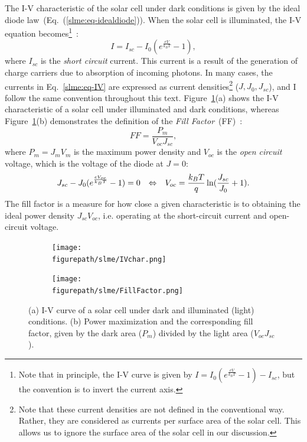 \begin{refsection}
The I-V characteristic of the solar cell under dark conditions is given by the 
ideal diode law~(Eq.~(\ref{slme:eq-idealdiode})). When the solar cell is 
illuminated, the I-V equation becomes\footnote{Note that in principle, the I-V 
curve is given by $I = I_0 (e^\frac{e V}{k_B T} - 1) - I_{sc}$, but the 
convention is to invert the current axis.}~\cite{Lindholm1979}: 
\begin{equation}\label{slme:eq-IV} 
I = I_{sc} - I_0 (e^\frac{e V}{k_B T} - 1), 
\end{equation} 
where $I_{sc}$ is the \textit{short circuit} current. This current is a result 
of the generation of charge carriers due to absorption of incoming photons. In 
many cases, the currents in Eq.~\ref{slme:eq-IV} are expressed as current 
densities\footnote{Note that these current densities are not defined in the 
conventional way. Rather, they are considered as currents per surface area of 
the solar cell. This allows us to ignore the surface area of the solar cell in 
our discussion.} ($J,J_0,J_{sc}$), and I follow the same convention 
throughout this text. Figure~\ref{slme:fig-IV_char}(a) shows the I-V 
characteristic of a solar cell under illuminated and dark conditions, whereas 
Figure~\ref{slme:fig-IV_char}(b) demonstrates the definition of the 
\textit{Fill Factor}~(FF)~\cite{Fonash2010}: 
\begin{equation} 
FF = \frac{P_{m}}{V_{oc} J_{sc}}, 
\end{equation} 
where $P_m = J_m V_m$ is the maximum power density and $V_{oc}$ is the 
\textit{open circuit} voltage, which is the voltage of the diode at $J = 0$: 
\begin{equation} 
J_{sc} - J_0 (e^\frac{eV_{oc}}{k_B T}-1) = 0 \hspace{0.1in} \Leftrightarrow 
\hspace{0.1in} V_{oc} = \frac{k_B T}{q} \ln (\frac{J_{sc}}{J_0} + 1). 
\end{equation} 
The fill factor is a measure for how close a given characteristic is to 
obtaining the ideal power density $J_{sc}V_{oc}$, i.e. operating at the 
short-circuit current and open-circuit voltage. 
 
\begin{figure}[ht]  
\centering 
\begin{subfigure}{0.5\textwidth} 
\centering 
\texttt{[image: \\figurepath/slme/IVchar.png]} 
\caption{} 
\end{subfigure}%
\begin{subfigure}{0.5\textwidth} 
\centering 
\texttt{[image: \\figurepath/slme/FillFactor.png]} 
\caption{} 
\end{subfigure} 
\caption{\label{slme:fig-IV_char} (a) I-V curve of a solar cell under dark and 
illuminated (light) conditions. (b) Power maximization and the corresponding 
fill factor, given by the dark area ($P_m$) divided by the light area ($V_{oc} 
J_{sc}$).} 
\end{figure} 
 

\end{refsection}
